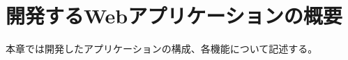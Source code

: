 \documentclass[main]{subfiles}
\begin{document}
\chapter{開発するWebアプリケーションの概要}
\label{cha:overview}
本章では開発したアプリケーションの構成、各機能について記述する。
\end{document}
